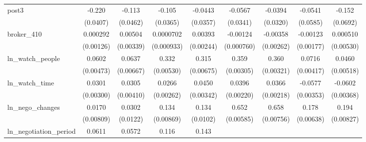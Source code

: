 {\begin{adjustbox}{max width=\textwidth}
\begin{tabular}{l*{8}{c}}
\addlinespace
post3       &      -0.220\sym{***}&      -0.113\sym{**} &      -0.105\sym{***}&     -0.0443         &     -0.0567\sym{*}  &     -0.0394         &     -0.0541         &      -0.152\sym{**} \\
            &    (0.0407)         &    (0.0462)         &    (0.0365)         &    (0.0357)         &    (0.0341)         &    (0.0320)         &    (0.0585)         &    (0.0692)         \\
\addlinespace
broker\_410  &    0.000292         &     0.00504         &   0.0000702         &     0.00393         &    -0.00124         &    -0.00358         &    -0.00123         &    0.000510         \\
            &   (0.00126)         &   (0.00339)         &  (0.000933)         &   (0.00244)         &  (0.000760)         &   (0.00262)         &   (0.00177)         &   (0.00530)         \\
\addlinespace
ln\_watch\_people&      0.0602\sym{***}&      0.0637\sym{***}&       0.332\sym{***}&       0.315\sym{***}&       0.359\sym{***}&       0.360\sym{***}&      0.0716\sym{***}&      0.0460\sym{***}\\
            &   (0.00473)         &   (0.00667)         &   (0.00530)         &   (0.00675)         &   (0.00305)         &   (0.00321)         &   (0.00417)         &   (0.00518)         \\
\addlinespace
ln\_watch\_time&      0.0301\sym{***}&      0.0305\sym{***}&      0.0266\sym{***}&      0.0450\sym{***}&      0.0396\sym{***}&      0.0366\sym{***}&     -0.0577\sym{***}&     -0.0602\sym{***}\\
            &   (0.00300)         &   (0.00410)         &   (0.00262)         &   (0.00342)         &   (0.00220)         &   (0.00218)         &   (0.00353)         &   (0.00368)         \\
\addlinespace
ln\_nego\_changes&      0.0170\sym{**} &      0.0302\sym{**} &       0.134\sym{***}&       0.134\sym{***}&       0.652\sym{***}&       0.658\sym{***}&       0.178\sym{***}&       0.194\sym{***}\\
            &   (0.00809)         &    (0.0122)         &   (0.00869)         &    (0.0102)         &   (0.00585)         &   (0.00756)         &   (0.00638)         &   (0.00827)         \\
\addlinespace
ln\_negotiation\_period&      0.0611\sym{***}&      0.0572\sym{***}&       0.116\sym{***}&       0.143\sym{***}&                     &                     &                     &                     \\

\end{tabular}
\end{adjustbox}}
